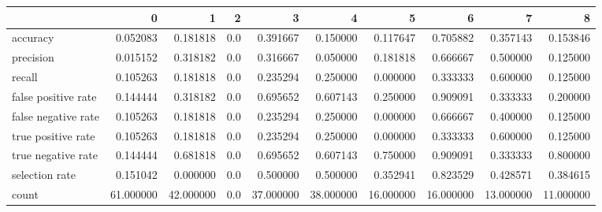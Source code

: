 \begin{tabular}{lrrrrrrrrr}
\toprule
{} &          0 &          1 &    2 &          3 &          4 &          5 &          6 &          7 &          8 \\
\midrule
accuracy            &   0.052083 &   0.181818 &  0.0 &   0.391667 &   0.150000 &   0.117647 &   0.705882 &   0.357143 &   0.153846 \\
precision           &   0.015152 &   0.318182 &  0.0 &   0.316667 &   0.050000 &   0.181818 &   0.666667 &   0.500000 &   0.125000 \\
recall              &   0.105263 &   0.181818 &  0.0 &   0.235294 &   0.250000 &   0.000000 &   0.333333 &   0.600000 &   0.125000 \\
false positive rate &   0.144444 &   0.318182 &  0.0 &   0.695652 &   0.607143 &   0.250000 &   0.909091 &   0.333333 &   0.200000 \\
false negative rate &   0.105263 &   0.181818 &  0.0 &   0.235294 &   0.250000 &   0.000000 &   0.666667 &   0.400000 &   0.125000 \\
true positive rate  &   0.105263 &   0.181818 &  0.0 &   0.235294 &   0.250000 &   0.000000 &   0.333333 &   0.600000 &   0.125000 \\
true negative rate  &   0.144444 &   0.681818 &  0.0 &   0.695652 &   0.607143 &   0.750000 &   0.909091 &   0.333333 &   0.800000 \\
selection rate      &   0.151042 &   0.000000 &  0.0 &   0.500000 &   0.500000 &   0.352941 &   0.823529 &   0.428571 &   0.384615 \\
count               &  61.000000 &  42.000000 &  0.0 &  37.000000 &  38.000000 &  16.000000 &  16.000000 &  13.000000 &  11.000000 \\
\bottomrule
\end{tabular}

